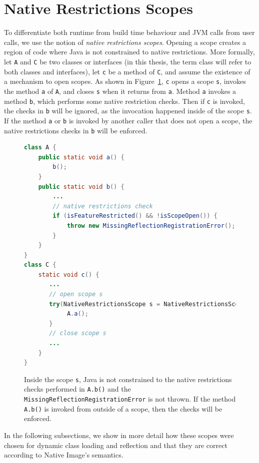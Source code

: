 \section{Native Restrictions Scopes}
To differentiate both runtime from build time behaviour and JVM calls from user calls, we use the notion of \emph{native restrictions scopes}. Opening a scope creates a region of code where Java is not constrained to native restrictions. 
More formally, let \verb|A| and \verb|C| be two classes or interfaces (in this thesis, the term class will refer to both classes and interfaces), let \verb|c| be a method of \verb|C|, and assume the existence of a mechanism to open scopes. As shown in Figure~\ref{fig:scopes}, \verb|c| opens a scope \verb|s|, invokes the method \verb|a| of \verb|A|, and closes \verb|s| when it returns from \verb|a|. Method \verb|a| invokes a method \verb|b|, which performs some native restriction checks.
Then if \verb|c| is invoked, the checks in \verb|b| will be ignored, as the invocation happened inside of the scope \verb|s|.
If the method \verb|a| or \verb|b| is invoked by another caller that does not open a scope, the native restrictions checks in \verb|b| will be enforced.

\begin{figure}[ht]
    \centering
\begin{lstlisting}[language=Java]
class A {
    public static void a() {
        b(); 
    }
    public static void b() {
        ...
        // native restrictions check
        if (isFeatureRestricted() && !isScopeOpen()) {
            throw new MissingReflectionRegistrationError();
        }
    }
} 
class C {
    static void c() {
       ...
       // open scope s
       try(NativeRestrictionsScope s = NativeRestrictionsScope.openScope()) {
            A.a();
       }
       // close scope s
       ...
    }
}
\end{lstlisting}
    \caption{Inside the scope \texttt{s}, Java is not constrained to the native restrictions checks performed in \texttt{A.b()} and the \texttt{MissingReflectionRegistrationError} is not thrown. If the method \texttt{A.b()} is invoked from outside of a scope, then the checks will be enforced.}
    \label{fig:scopes}
\end{figure}

In the following subsections, we show in more detail how these scopes were chosen for dynamic class loading and reflection and that they are correct according to Native Image's semantics.

